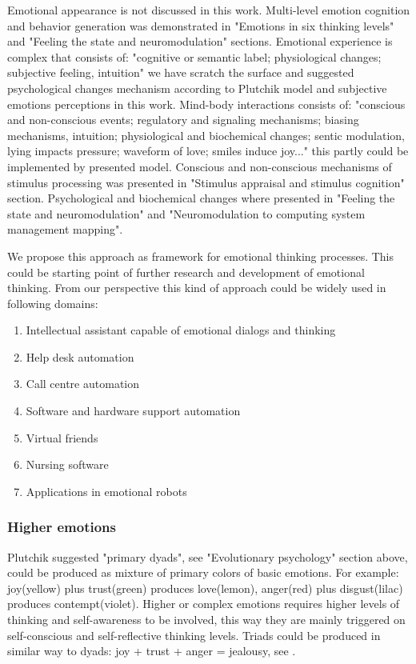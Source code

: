 Emotional appearance is not discussed in this work. Multi-level emotion cognition and behavior generation was demonstrated in "Emotions in six thinking levels" and "Feeling the state and neuromodulation" sections. Emotional experience is complex that consists of: "cognitive or semantic label; physiological changes; subjective feeling, intuition" we have scratch the surface and suggested psychological changes mechanism according to Plutchik model and subjective emotions perceptions in this work. Mind-body interactions consists of: "conscious and non-conscious events; regulatory and signaling mechanisms; biasing mechanisms, intuition; physiological and biochemical changes; sentic modulation, lying impacts pressure; waveform of love; smiles induce joy..." this partly could be implemented by presented model. Conscious and non-conscious mechanisms of stimulus processing was presented in "Stimulus appraisal and stimulus cognition" section. Psychological and biochemical changes where presented in "Feeling the state and neuromodulation" and "Neuromodulation to computing system management mapping".

We propose this approach as framework for emotional thinking processes. This could be starting point of further research and development of emotional thinking. From our perspective this kind of approach could be widely used in following domains:

\begin{enumerate}
\item  Intellectual assistant capable of emotional dialogs and thinking
\item  Help desk automation
\item  Call centre automation
\item  Software and hardware support automation
\item  Virtual friends
\item  Nursing software
\item  Applications in emotional robots
\end{enumerate}

\subsubsection{Higher emotions}

Plutchik\cite{natureofemotions} suggested "primary dyads", see "Evolutionary psychology" section above, could be produced as mixture of primary colors of basic emotions. For example: joy(yellow) plus trust(green) produces love(lemon), anger(red) plus disgust(lilac) produces contempt(violet). Higher or complex emotions requires higher levels of thinking and self-awareness to be involved, this way they are mainly triggered on self-conscious and self-reflective thinking levels. Triads could be produced in similar way to dyads: joy + trust + anger = jealousy, see \cite{senticcomputing}.

